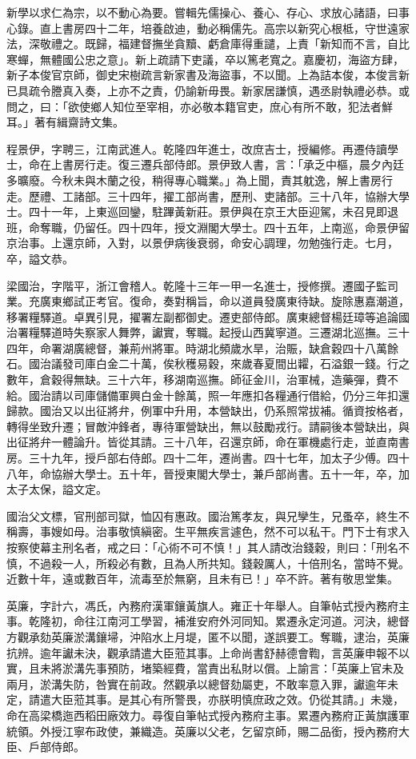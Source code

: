 \begin{pinyinscope}
新學以求仁為宗，以不動心為要。嘗輯先儒操心、養心、存心、求放心諸語，曰事心錄。直上書房四十二年，培養啟迪，動必稱儒先。高宗以新究心根柢，守世遠家法，深敬禮之。既歸，福建督撫坐貪黷、虧倉庫得重譴，上責「新知而不言，自比寒蟬，無體國公忠之意」。新上疏請下吏議，卒以篤老寬之。嘉慶初，海盜方肆，新子本俊官京師，御史宋樹疏言新家書及海盜事，不以聞。上為詰本俊，本俊言新已具疏令謄真入奏，上亦不之責，仍諭新毋畏。新家居謙慎，遇丞尉執禮必恭。或問之，曰：「欲使鄉人知位至宰相，亦必敬本籍官吏，庶心有所不敢，犯法者鮮耳。」著有緝齋詩文集。

程景伊，字聘三，江南武進人。乾隆四年進士，改庶吉士，授編修。再遷侍讀學士，命在上書房行走。復三遷兵部侍郎。景伊致人書，言：「承乏中樞，晨夕內廷多曠廢。今秋未與木蘭之役，稍得專心職業。」為上聞，責其躭逸，解上書房行走。歷禮、工諸部。三十四年，擢工部尚書，歷刑、吏諸部。三十八年，協辦大學士。四十一年，上東巡回鑾，駐蹕黃新莊。景伊與在京王大臣迎駕，未召見即退班，命奪職，仍留任。四十四年，授文淵閣大學士。四十五年，上南巡，命景伊留京治事。上還京師，入對，以景伊病後衰弱，命安心調理，勿勉強行走。七月，卒，謚文恭。

梁國治，字階平，浙江會稽人。乾隆十三年一甲一名進士，授修撰。遷國子監司業。充廣東鄉試正考官。復命，奏對稱旨，命以道員發廣東待缺。旋除惠嘉潮道，移署糧驛道。卓異引見，擢署左副都御史。遷吏部侍郎。廣東總督楊廷璋等追論國治署糧驛道時失察家人舞弊，讞實，奪職。起授山西冀寧道。三遷湖北巡撫。三十四年，命署湖廣總督，兼荊州將軍。時湖北頻歲水旱，治賑，缺倉穀四十八萬餘石。國治議發司庫白金二十萬，俟秋穫易穀，來歲春夏間出糶，石溢銀一錢。行之數年，倉穀得無缺。三十六年，移湖南巡撫。師征金川，治軍械，造藥彈，費不給。國治請以司庫儲備軍興白金十餘萬，照一年應扣各糧通行借給，仍分三年扣還歸款。國治又以出征將弁，例軍中升用，本營缺出，仍系照常拔補。循資按格者，轉得坐致升遷；冒敵沖鋒者，專待軍營缺出，無以鼓勵戎行。請嗣後本營缺出，與出征將弁一體論升。皆從其請。三十八年，召還京師，命在軍機處行走，並直南書房。三十九年，授戶部右侍郎。四十二年，遷尚書。四十七年，加太子少傅。四十八年，命協辦大學士。五十年，晉授東閣大學士，兼戶部尚書。五十一年，卒，加太子太保，謚文定。

國治父文標，官刑部司獄，恤囚有惠政。國治篤孝友，與兄孿生，兄蚤卒，終生不稱壽，事嫂如母。治事敬慎縝密。生平無疾言遽色，然不可以私干。門下士有求入按察使幕主刑名者，戒之曰：「心術不可不慎！」其人請改治錢穀，則曰：「刑名不慎，不過殺一人，所殺必有數，且為人所共知。錢穀厲人，十倍刑名，當時不覺。近數十年，遠或數百年，流毒至於無窮，且未有已！」卒不許。著有敬思堂集。

英廉，字計六，馮氏，內務府漢軍鑲黃旗人。雍正十年舉人。自筆帖式授內務府主事。乾隆初，命往江南河工學習，補淮安府外河同知。累遷永定河道。河決，總督方觀承劾英廉淤溝鑲埽，沖陷水上月堤，匿不以聞，遂誤要工。奪職，逮治，英廉抗辨。逾年讞未決，觀承請遣大臣蒞其事。上命尚書舒赫德會鞫，言英廉申報不以實，且未將淤溝先事預防，堵築經費，當責出私財以償。上諭言：「英廉上官未及兩月，淤溝失防，咎實在前政。然觀承以總督劾屬吏，不敢率意入罪，讞逾年未定，請遣大臣蒞其事。是其心有所警畏，亦朕明慎庶政之效。仍從其請。」未幾，命在高梁橋迤西稻田廠效力。尋復自筆帖式授內務府主事。累遷內務府正黃旗護軍統領。外授江寧布政使，兼織造。英廉以父老，乞留京師，賜二品銜，授內務府大臣、戶部侍郎。


\end{pinyinscope}
